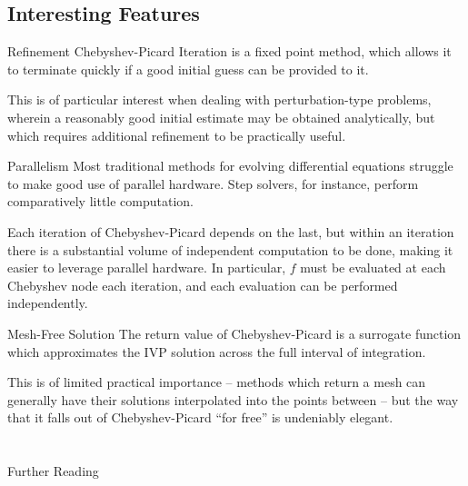 \documentclass[pdf]{beamer}
\makeatletter
\def\beamer@writeslidentry@miniframesoff{%
  \expandafter\beamer@ifempty\expandafter{\beamer@framestartpage}{}%
  {%
    \clearpage\beamer@notesactions%
  }
}
\newcommand*{\miniframesoff}{\let\beamer@writeslidentry=\beamer@writeslidentry@miniframesoff}
\makeatother
\begin{document}
\subsection{Interesting Features}

\begin{frame}{Refinement}
  Chebyshev-Picard Iteration is a fixed point method, which allows it to terminate quickly
  if a good initial guess can be provided to it.\newline

  This is of particular interest when dealing with perturbation-type problems,
  wherein a reasonably good initial estimate may be obtained analytically, but
  which requires additional refinement to be practically useful.
\end{frame}  

\begin{frame}{Parallelism}
  Most traditional methods for evolving differential equations struggle to make
  good use of parallel hardware. Step solvers, for instance, perform comparatively
  little computation.\newline

  Each iteration of Chebyshev-Picard depends on the last, but within an iteration there
  is a substantial volume of independent computation to be done, making it easier to leverage
  parallel hardware. In particular, $f$ must be evaluated at each Chebyshev node each
  iteration, and each evaluation can be performed independently.
\end{frame}  

\begin{frame}{Mesh-Free Solution}
  The return value of Chebyshev-Picard is a surrogate function which
  approximates the IVP solution across the full interval of integration.\newline

  This is of limited practical importance -- methods which return a mesh can
  generally have their solutions interpolated into the points between -- but the
  way that it falls out of Chebyshev-Picard ``for free'' is undeniably elegant.
\end{frame}

\miniframesoff
\section*{}
\begin{frame}{Further Reading}
  \AtNextBibliography{\tiny}
  \nocite{*}
  \printbibliography
\end{frame}
\end{document}
